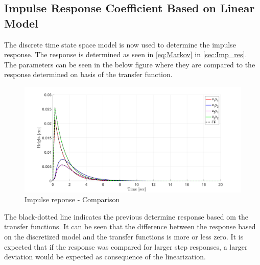 \subsection{Impulse Response Coefficient Based on Linear Model}
The discrete time state space model is now used to determine the impulse response. The response is determined as seen in \cref{eq:Markov} in \cref{sec:Imp_res}. The parameters can be seen in the below figure where they are compared to the response determined on basis of the transfer function.
\begin{figure}[H]
    \centering
    \includegraphics[width=1\textwidth]{Figures/Pr4.6_Markov_compare.png}
    \caption{Impulse reponse - Comparison}
    \label{fig:Markov_compare}
\end{figure}
The black-dotted line indicates the previous determine response based om the transfer functions. It can be seen that the difference between the response based on the discretized model and the transfer functions is more or less zero. It is expected that if the response was compared for larger step responses, a larger deviation would be expected as consequence of the linearization.